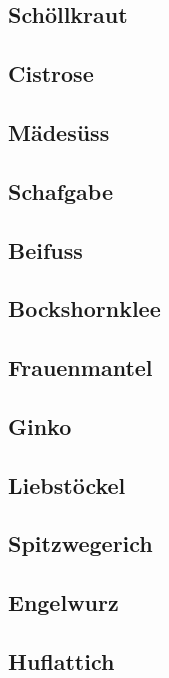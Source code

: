 \subsection{Schöllkraut}

\subsection{Cistrose}

\subsection{Mädesüss}

\subsection{Schafgabe}

\subsection{Beifuss}

\subsection{Bockshornklee}

\subsection{Frauenmantel}

\subsection{Ginko}

\subsection{Liebstöckel}

\subsection{Spitzwegerich}

\subsection{Engelwurz}

\subsection{Huflattich}

